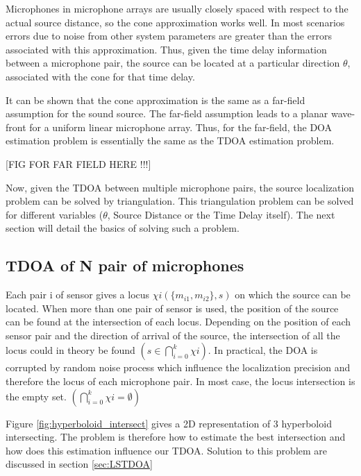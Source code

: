 Microphones in microphone arrays are usually closely spaced with respect to the actual source distance, so the cone approximation works well. In most scenarios errors due to noise from other system parameters are greater than the errors associated with this approximation. Thus, given the time delay information between a microphone pair, the source can be located at a particular direction $\theta$, associated with the cone for that time delay. 

It can be shown that the cone approximation is the same as a far-field assumption for the sound source. The far-field assumption leads to a planar wave-front for a uniform linear microphone array. Thus, for the far-field, the DOA estimation problem is essentially the same as the TDOA estimation problem.

[FIG FOR FAR FIELD HERE !!!]

Now, given the TDOA between multiple microphone pairs, the source localization problem can be solved by triangulation. This triangulation problem can be solved for different variables ($\theta$, Source Distance or the Time Delay itself). The next section will detail the basics of solving such a problem. 

\subsection{TDOA of N pair of microphones}\label{sec:TDOAN}

Each pair i of sensor gives a locus $\chi{i}(\{m_{i1},m_{i2}\},s)$ on which the source can be located. When more than one pair of sensor is used, the position of the source can be found at the intersection of each locus. Depending on the position of each sensor pair and the direction of arrival of the source, the intersection of all the locus could in theory be found $ ( s\in {\bigcap}_{i=0}^k \chi{i} )$. In practical, the DOA is corrupted by random noise process which influence the localization precision and therefore the locus of each microphone pair. In most case, the locus intersection is the empty set. $ ( {\bigcap}_{i=0}^k \chi{i} = \emptyset ) $


Figure \ref{fig:hyperboloid_intersect} gives a 2D representation of 3 hyperboloid intersecting. The problem is therefore how to estimate the best intersection and how does this estimation influence our TDOA. Solution to this problem are discussed in section \ref{sec:LSTDOA}

